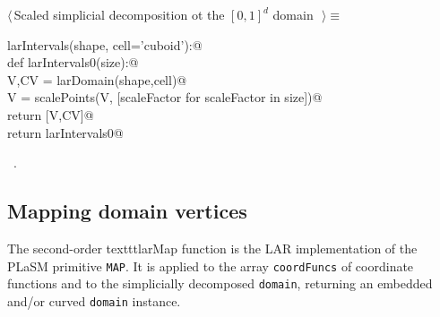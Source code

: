 \documentclass[11pt,oneside]{article}	%
\begin{document}
\begin{flushleft} \small \label{scrap2}
$\langle\,$Scaled simplicial decomposition ot the $[0,1]^d$ domain\nobreak\ {\footnotesize {}}$\,\rangle\equiv$
\vspace{-1ex}
\begin{list}{}{} \item
\mbox{}\verb@def larIntervals(shape, cell='cuboid'):@\\
\mbox{}\verb@   def larIntervals0(size):@\\
\mbox{}\verb@      V,CV = larDomain(shape,cell)@\\
\mbox{}\verb@      V = scalePoints(V, [scaleFactor for scaleFactor in size])@\\
\mbox{}\verb@      return [V,CV]@\\
\mbox{}\verb@   return larIntervals0@\\
\mbox{}\verb@@{\NWsep}
\end{list}
\vspace{-1ex}
\footnotesize\addtolength{\baselineskip}{-1ex}
\begin{list}{}{\setlength{\itemsep}{-\parsep}\setlength{\itemindent}{-\leftmargin}}
\item \NWtxtMacroRefIn\ .
\end{list}
\end{flushleft}

\subsection{Mapping domain vertices}
The second-order texttt{larMap} function is the LAR implementation of the PLaSM primitive \texttt{MAP}.
It is applied to the array \texttt{coordFuncs} of coordinate functions and to the simplicially decomposed  \texttt{domain}, returning an embedded and/or curved \texttt{domain} instance.
\end{document}

